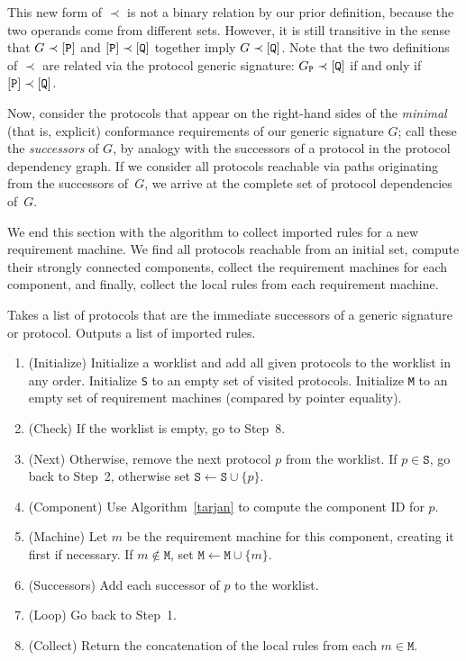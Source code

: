 \documentclass[../generics]{subfiles}
\begin{document}
This new form of $\prec$ is not a binary relation by our prior definition, because the two operands come from different sets. However, it is still transitive in the sense that $G\prec[\texttt{P}]$ and $[\texttt{P}]\prec[\texttt{Q}]$ together imply $G\prec[\texttt{Q}]$. Note that the two definitions of $\prec$ are related via the protocol generic signature: $G_\texttt{P}\prec[\texttt{Q}]$ if and only if $[\texttt{P}]\prec[\texttt{Q}]$.

Now, consider the protocols that appear on the right-hand sides of the \emph{minimal} (that is, explicit) conformance requirements of our generic signature $G$; call these the \emph{successors} of $G$, by analogy with the successors of a protocol in the protocol dependency graph. If we consider all protocols reachable via paths originating from the successors of~$G$, we arrive at the complete set of protocol dependencies of~$G$.

We end this section with the algorithm to collect imported rules for a new requirement machine. We find all protocols reachable from an initial set, compute their strongly connected components, collect the requirement machines for each component, and finally, collect the local rules from each requirement machine.
\begin{algorithm}\label{importing rules}
Takes a list of protocols that are the immediate successors of a generic signature or protocol. Outputs a list of imported rules.
\begin{enumerate}
\item (Initialize) Initialize a worklist and add all given protocols to the worklist in any order. Initialize \texttt{S} to an empty set of visited protocols. Initialize \texttt{M} to an empty set of requirement machines (compared by pointer equality).
\item (Check) If the worklist is empty, go to Step~8.
\item (Next) Otherwise, remove the next protocol $p$ from the worklist. If $p\in\texttt{S}$, go back to Step~2, otherwise set $\texttt{S}\leftarrow\texttt{S}\cup\{p\}$.
\item (Component) Use Algorithm~\ref{tarjan} to compute the component ID for $p$.
\item (Machine) Let $m$ be the requirement machine for this component, creating it first if necessary. If $m\not\in\texttt{M}$, set $\texttt{M}\leftarrow\texttt{M}\cup\{m\}$.
\item (Successors) Add each successor of $p$ to the worklist.
\item (Loop) Go back to Step~1.
\item (Collect) Return the concatenation of the local rules from each $m\in\texttt{M}$.
\end{enumerate}
\end{algorithm}
\end{document}
